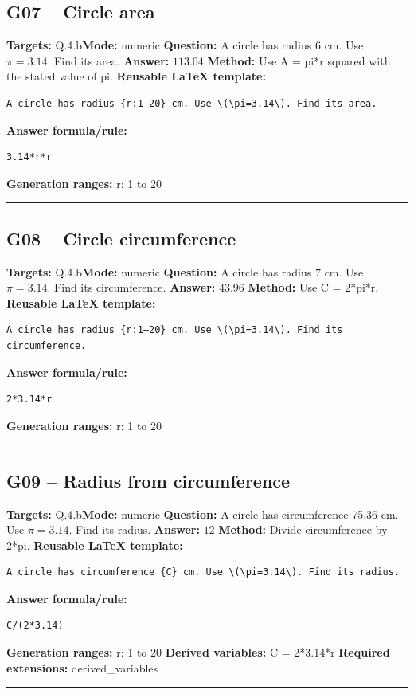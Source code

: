 \documentclass[11pt]{article}
\begin{document}
\subsection{G07 -- Circle area}
\textbf{Targets:} Q.4.b\quad\textbf{Mode:} numeric
\textbf{Question:} A circle has radius 6 cm. Use \(\pi=3.14\). Find its area.
\textbf{Answer:} \(113.04\)
\textbf{Method:} Use A = pi*r squared with the stated value of pi.
\textbf{Reusable LaTeX template:}
\begin{verbatim}
A circle has radius {r:1–20} cm. Use \(\pi=3.14\). Find its area.
\end{verbatim}
\textbf{Answer formula/rule:}
\begin{verbatim}
3.14*r*r
\end{verbatim}
\textbf{Generation ranges:} r: 1 to 20
\medskip\hrule\medskip
\subsection{G08 -- Circle circumference}
\textbf{Targets:} Q.4.b\quad\textbf{Mode:} numeric
\textbf{Question:} A circle has radius 7 cm. Use \(\pi=3.14\). Find its circumference.
\textbf{Answer:} \(43.96\)
\textbf{Method:} Use C = 2*pi*r.
\textbf{Reusable LaTeX template:}
\begin{verbatim}
A circle has radius {r:1–20} cm. Use \(\pi=3.14\). Find its circumference.
\end{verbatim}
\textbf{Answer formula/rule:}
\begin{verbatim}
2*3.14*r
\end{verbatim}
\textbf{Generation ranges:} r: 1 to 20
\medskip\hrule\medskip
\subsection{G09 -- Radius from circumference}
\textbf{Targets:} Q.4.b\quad\textbf{Mode:} numeric
\textbf{Question:} A circle has circumference 75.36 cm. Use \(\pi=3.14\). Find its radius.
\textbf{Answer:} \(12\)
\textbf{Method:} Divide circumference by 2*pi.
\textbf{Reusable LaTeX template:}
\begin{verbatim}
A circle has circumference {C} cm. Use \(\pi=3.14\). Find its radius.
\end{verbatim}
\textbf{Answer formula/rule:}
\begin{verbatim}
C/(2*3.14)
\end{verbatim}
\textbf{Generation ranges:} r: 1 to 20
\textbf{Derived variables:} C = 2*3.14*r
\textbf{Required extensions:} derived\_variables
\medskip\hrule\medskip
\end{document}
